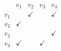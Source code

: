 

\[
\begin{array}{c|c|c|c|c}
    & v_1 & v_2 & v_3 & v_4 \\\hline
    v_1 & & \checkmark & & \checkmark \\\hline
    v_2 & \checkmark & & & \\\hline
    v_3 & & & & \checkmark \\\hline
    v_4 & \checkmark & & \checkmark &
\end{array}
\]
